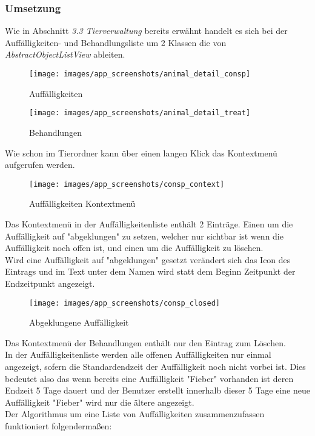 \subsubsection{Umsetzung}
Wie in Abschnitt \textit{3.3 Tierverwaltung} bereits erwähnt handelt es sich bei der Auffälligkeiten- und Behandlungsliste um 2 Klassen die von \textit{AbstractObjectListView} ableiten. 
\begin{figure}[H]
  \centering
  \begin{minipage}[t]{7 cm}
  	\centering
  	\texttt{[image: images/app\_screenshots/animal\_detail\_consp]} 
    \caption{Auffälligkeiten}
  \end{minipage}
  \hspace{0.5cm}
  \begin{minipage}[t]{7 cm}
	\centering
	\texttt{[image: images/app\_screenshots/animal\_detail\_treat]}  
    \caption{Behandlungen}
  \end{minipage}
\end{figure}
Wie schon im Tierordner kann über einen langen Klick das Kontextmenü aufgerufen werden. 
\begin{figure}[H]
\centering
\texttt{[image: images/app\_screenshots/consp\_context]}
\caption{Auffälligkeiten Kontextmenü}
\end{figure}
Das Kontextmenü in der Auffälligkeitenliste enthält 2 Einträge. Einen um die Auffälligkeit auf "abgeklungen" zu setzen, welcher nur sichtbar ist wenn die Auffälligkeit noch offen ist, und einen um die Auffälligkeit zu löschen.\\
Wird eine Auffälligkeit auf "abgeklungen" gesetzt verändert sich das Icon des Eintrags und im Text unter dem Namen wird statt dem Beginn Zeitpunkt der Endzeitpunkt angezeigt.
\begin{figure}[H]
\centering
\texttt{[image: images/app\_screenshots/consp\_closed]}
\caption{Abgeklungene Auffälligkeit}
\end{figure}
Das Kontextmenü der Behandlungen enthält nur den Eintrag zum Löschen. \\[0.5em]
In der Auffälligkeitenliste werden alle offenen Auffälligkeiten nur einmal angezeigt, sofern die Standardendzeit der Auffälligkeit noch nicht vorbei ist. Dies bedeutet also das wenn bereits eine Auffälligkeit "Fieber" vorhanden ist deren Endzeit 5 Tage dauert und der Benutzer erstellt innerhalb dieser 5 Tage eine neue Auffälligkeit "Fieber" wird nur die ältere angezeigt. \\
Der Algorithmus um eine Liste von Auffälligkeiten zusammenzufassen funktioniert folgendermaßen: 
